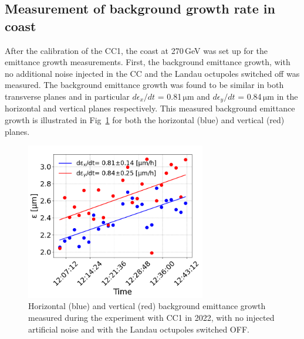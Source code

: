 \subsection{Measurement of background growth rate in coast}\label{ref:measured_backgorund_growth_cc_md_202}
After the calibration of the CC1, the coast at 270\,GeV was set up for the emittance growth measurements. First, the background emittance growth, with no additional noise injected in the CC and the Landau octupoles switched off was measured. The background emittance growth was found to be similar in both transverse planes and in particular $d\epsilon_x /dt$ = 0.81\,$\mathrm{\mu m}$ and $d\epsilon_y /dt$ = 0.84\,$\mathrm{\mu m}$ in the horizontal and vertical planes respectively. This measured background emittance growth is illustrated in Fig~\ref{fig:cc_md_2022_background_growth_in_scan} for both the horizontal (blue) and vertical (red) planes.

\begin{figure}[!h] %
   \centering         
   \includegraphics[width=0.7\textwidth]{images/Ch8/cc_md_2022_background_in_scan.png}
       \caption{Horizontal (blue) and vertical (red) background emittance growth measured during the experiment with CC1 in 2022, with no injected artificial noise and with the Landau octupoles switched OFF.}
       \label{fig:cc_md_2022_background_growth_in_scan}
\end{figure}


